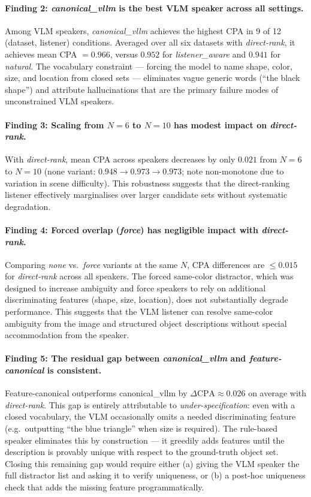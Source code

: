 \documentclass[11pt]{article}
\begin{document}
\paragraph{Finding 2: \textit{canonical\_vllm} is the best VLM speaker across all settings.}
Among VLM speakers, \textit{canonical\_vllm} achieves the highest CPA in 9 of 12
(dataset, listener) conditions.
Averaged over all six datasets with \textit{direct-rank}, it achieves mean
CPA $= 0.966$, versus $0.952$ for \textit{listener\_aware} and $0.941$ for
\textit{natural}.
The vocabulary constraint --- forcing the model to name shape, color, size, and
location from closed sets --- eliminates vague generic words (``the black shape'')
and attribute hallucinations that are the primary failure modes of unconstrained VLM speakers.

\paragraph{Finding 3: Scaling from $N{=}6$ to $N{=}10$ has modest impact on \textit{direct-rank}.}
With \textit{direct-rank}, mean CPA across speakers decreases by only $0.021$
from $N{=}6$ to $N{=}10$ (none variant: $0.948 \to 0.973 \to 0.973$; note
non-monotone due to variation in scene difficulty).
This robustness suggests that the direct-ranking listener effectively marginalises
over larger candidate sets without systematic degradation.

\paragraph{Finding 4: Forced overlap (\textit{force}) has negligible impact with \textit{direct-rank}.}
Comparing \textit{none} vs.\ \textit{force} variants at the same $N$, CPA differences
are $\leq 0.015$ for \textit{direct-rank} across all speakers.
The forced same-color distractor, which was designed to increase ambiguity and
force speakers to rely on additional discriminating features (shape, size, location),
does not substantially degrade performance.
This suggests that the VLM listener can resolve same-color ambiguity from the
image and structured object descriptions without special accommodation from
the speaker.

\paragraph{Finding 5: The residual gap between \textit{canonical\_vllm} and \textit{feature-canonical} is consistent.}
Feature-canonical outperforms canonical\_vllm by $\Delta\text{CPA} \approx 0.026$
on average with \textit{direct-rank}.
This gap is entirely attributable to \emph{under-specification}: even with a
closed vocabulary, the VLM occasionally omits a needed discriminating feature
(e.g.\ outputting ``the blue triangle'' when size is required).
The rule-based speaker eliminates this by construction --- it greedily adds
features until the description is provably unique with respect to the ground-truth
object set.  Closing this remaining gap would require either (a) giving the VLM
speaker the full distractor list and asking it to verify uniqueness, or (b)
a post-hoc uniqueness check that adds the missing feature programmatically.
\end{document}
